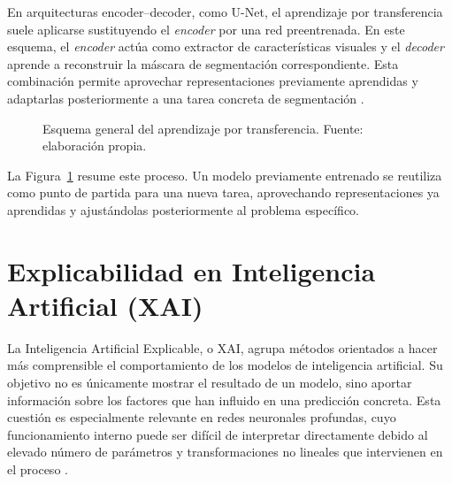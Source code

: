En arquitecturas encoder--decoder, como U-Net, el aprendizaje por transferencia suele aplicarse sustituyendo el \textit{encoder} por una red preentrenada. En este esquema, el \textit{encoder} actúa como extractor de características visuales y el \textit{decoder} aprende a reconstruir la máscara de segmentación correspondiente. Esta combinación permite aprovechar representaciones previamente aprendidas y adaptarlas posteriormente a una tarea concreta de segmentación \citep{ronneberger2015unet,tajbakhsh2016cnn,mei2022radimagenet}.

\begin{figure}[htbp]
    \centering
    \caption{Esquema general del aprendizaje por transferencia. Fuente: elaboración propia.}
    \label{fig:transfer_learning_general}
\end{figure}

La Figura~\ref{fig:transfer_learning_general} resume este proceso. Un modelo previamente entrenado se reutiliza como punto de partida para una nueva tarea, aprovechando representaciones ya aprendidas y ajustándolas posteriormente al problema específico.

\section{Explicabilidad en Inteligencia Artificial (XAI)}

La Inteligencia Artificial Explicable, o XAI, agrupa métodos orientados a hacer más comprensible el comportamiento de los modelos de inteligencia artificial. Su objetivo no es únicamente mostrar el resultado de un modelo, sino aportar información sobre los factores que han influido en una predicción concreta. Esta cuestión es especialmente relevante en redes neuronales profundas, cuyo funcionamiento interno puede ser difícil de interpretar directamente debido al elevado número de parámetros y transformaciones no lineales que intervienen en el proceso \citep{arrieta2020xai,samek2017explainableartificialintelligenceunderstanding}.

